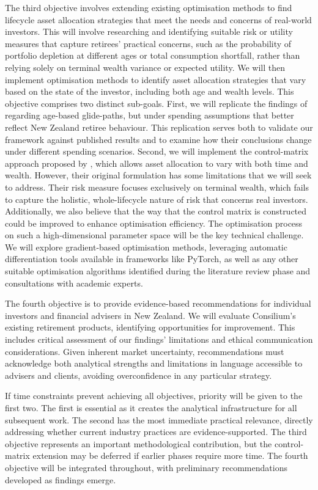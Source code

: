 \documentclass[11pt]{article}
\begin{document}
The third objective involves extending existing optimisation methods to find lifecycle asset allocation strategies that meet the needs and concerns of real-world investors. This will involve researching and identifying suitable risk or utility measures that capture retirees' practical concerns, such as the probability of portfolio depletion at different ages or total consumption shortfall, rather than relying solely on terminal wealth variance or expected utility. We will then implement optimisation methods to identify asset allocation strategies that vary based on the state of the investor, including both age and wealth levels. This objective comprises two distinct sub-goals. First, we will replicate the findings of \textcite{anarkulova2025beyond} regarding age-based glide-paths, but under spending assumptions that better reflect New Zealand retiree behaviour. This replication serves both to validate our framework against published results and to examine how their conclusions change under different spending scenarios. Second, we will implement the control-matrix approach proposed by \textcite{Makinen2024}, which allows asset allocation to vary with both time and wealth. However, their original formulation has some limitations that we will seek to address. Their risk measure focuses exclusively on terminal wealth, which fails to capture the holistic, whole-lifecycle nature of risk that concerns real investors. Additionally, we also believe that the way that the control matrix is constructed could be improved to enhance optimisation efficiency. The optimisation process on such a high-dimensional parameter space will be the key technical challenge. We will explore gradient-based optimisation methods, leveraging automatic differentiation tools available in frameworks like PyTorch, as well as any other suitable optimisation algorithms identified during the literature review phase and consultations with academic experts.

The fourth objective is to provide evidence-based recommendations for individual investors and financial advisers in New Zealand. We will evaluate Consilium's existing retirement products, identifying opportunities for improvement. This includes critical assessment of our findings' limitations and ethical communication considerations. Given inherent market uncertainty, recommendations must acknowledge both analytical strengths and limitations in language accessible to advisers and clients, avoiding overconfidence in any particular strategy.

If time constraints prevent achieving all objectives, priority will be given to the first two. The first is essential as it creates the analytical infrastructure for all subsequent work. The second has the most immediate practical relevance, directly addressing whether current industry practices are evidence-supported. The third objective represents an important methodological contribution, but the control-matrix extension may be deferred if earlier phases require more time. The fourth objective will be integrated throughout, with preliminary recommendations developed as findings emerge.
\end{document}
